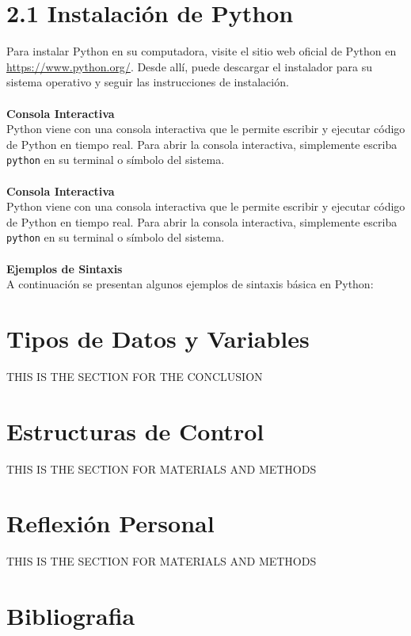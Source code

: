 \documentclass[a4paper, 12pt]{article}
\begin{document}
\section*{2.1 Instalación de Python}
Para instalar Python en su computadora, visite el sitio web oficial de Python en \url{https://www.python.org/}. Desde allí, puede descargar el instalador para su sistema operativo y seguir las instrucciones de instalación.
\\
\\
\textbf{Consola Interactiva}\\
Python viene con una consola interactiva que le permite escribir y ejecutar código de Python en tiempo real. Para abrir la consola interactiva, simplemente escriba \texttt{python} en su terminal o símbolo del sistema.
\\
\\
\textbf{Consola Interactiva}\\
Python viene con una consola interactiva que le permite escribir y ejecutar código de Python en tiempo real. Para abrir la consola interactiva, simplemente escriba \texttt{python} en su terminal o símbolo del sistema.
\\
\\
\textbf{Ejemplos de Sintaxis}\\
A continuación se presentan algunos ejemplos de sintaxis básica en Python:


\clearpage
\section{Tipos de Datos y Variables}
THIS IS THE SECTION FOR THE CONCLUSION

\clearpage
\section{Estructuras de Control}
THIS IS THE SECTION FOR MATERIALS AND METHODS

\clearpage
\section{Reflexión Personal}
THIS IS THE SECTION FOR MATERIALS AND METHODS

\clearpage
\section{Bibliografia}
\printbibliography
\end{document}
